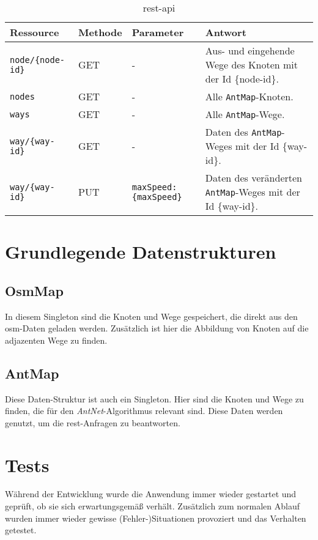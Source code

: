 \begin{table}[htbp]
  \centering
  \begin{tabularx}{\textwidth}{l|l|l|X}
    Ressource & Methode & Parameter & Antwort \\
    \hline
    \texttt{node/\{node-id\}} & GET & - & Aus- und eingehende Wege des Knoten mit der Id \{node-id\}. \\
    \hline
    \texttt{nodes} & GET & - & Alle \texttt{AntMap}-Knoten. \\
    \hline
    \texttt{ways} & GET & - & Alle \texttt{AntMap}-Wege. \\
    \hline
    \texttt{way/\{way-id\}} & GET & - & Daten des \texttt{AntMap}-Weges mit der Id \{way-id\}. \\
    \hline
    \texttt{way/\{way-id\}} & PUT & \texttt{maxSpeed: \{maxSpeed\}} & Daten des veränderten \texttt{AntMap}-Weges mit der Id \{way-id\}. \\
  \end{tabularx}
  \caption{\gls{rest}-\gls{api}}
  \label{tab:rest-api}
\end{table}

\section{Grundlegende Datenstrukturen}
\label{sec:grundlegende-datenstrukturen}

\subsection{OsmMap}
\label{sec:osm-map}

In diesem Singleton sind die Knoten und Wege gespeichert, die direkt aus den \gls{osm}-Daten geladen werden.
Zusätzlich ist hier die Abbildung von Knoten auf die adjazenten Wege zu finden.

\subsection{AntMap}
\label{sec:Ant-map}

Diese Daten-Struktur ist auch ein Singleton.
Hier sind die Knoten und Wege zu finden, die für den \textit{AntNet}-Algorithmus relevant sind.
Diese Daten werden genutzt, um die \gls{rest}-Anfragen zu beantworten.

\section{Tests}
\label{sec:tests}

Während der Entwicklung wurde die Anwendung immer wieder gestartet und geprüft, ob sie sich erwartungsgemäß verhält.
Zusätzlich zum normalen Ablauf wurden immer wieder gewisse (Fehler-)Situationen provoziert und das Verhalten getestet.
